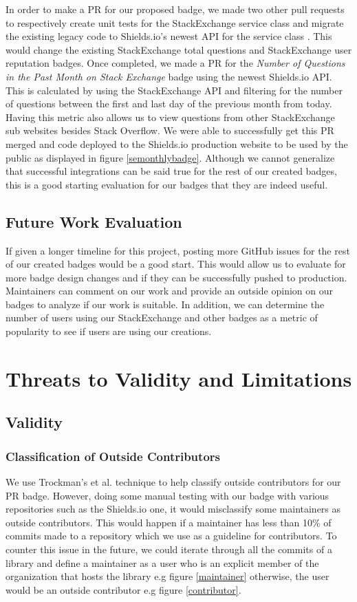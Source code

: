 \documentclass[12pt, letterpaper]{article}
\begin{document}
In order to make a PR for our proposed badge, we made two other pull requests to respectively
create unit tests for the StackExchange service class \cite{testspr} and migrate the existing legacy code to Shields.io's newest
API for the service class \cite{portpr}. This would change the existing StackExchange total questions and StackExchange
user reputation badges. Once completed, we made a PR for the \textit{Number of Questions in the Past Month on Stack Exchange}
badge \cite{sepr} using the newest Shields.io API. This is calculated by using the StackExchange API and filtering for the 
number of questions between the first and last day of the previous month from today. Having this metric also
allows us to view questions from other StackExchange sub websites besides Stack Overflow.
We were able to successfully get this PR merged and code deployed to the Shields.io \cite{shields} 
production website to be used by the public as displayed in figure \ref{semonthlybadge}. 
Although we cannot generalize that successful integrations can be said
true for the rest of our created badges, this is a good starting evaluation for our badges
that they are indeed useful. 

\subsection{Future Work Evaluation}
If given a longer timeline for this project, posting more GitHub issues for the rest of
our created badges would be a good start. This would allow us to evaluate for more badge design changes
and if they can be successfully pushed to production. Maintainers can comment on our work
and provide an outside opinion on our badges to analyze if our work is suitable. 
In addition, we can determine the number of users using our StackExchange and other badges as
a metric of popularity to see if users are using our creations. 

\section{Threats to Validity and Limitations}

\subsection{Validity}
\subsubsection{Classification of Outside Contributors}
We use Trockman's et al. \cite{githubbadges} technique to help classify outside contributors for our PR badge.
However, doing some manual testing with our badge with various repositories such
as the Shields.io \cite{shieldsrepo} one, it would misclassify some maintainers as outside contributors.
This would happen if a maintainer has less than 10\% of commits made to a repository which we use as a guideline
for contributors.
To counter this issue in the future, we could iterate through all the commits of a library and define a maintainer as a user who is an explicit 
member of the organization that hosts
the library e.g figure \ref{maintainer} otherwise, the user would be an outside contributor e.g figure \ref{contributor}. 
\end{document}
